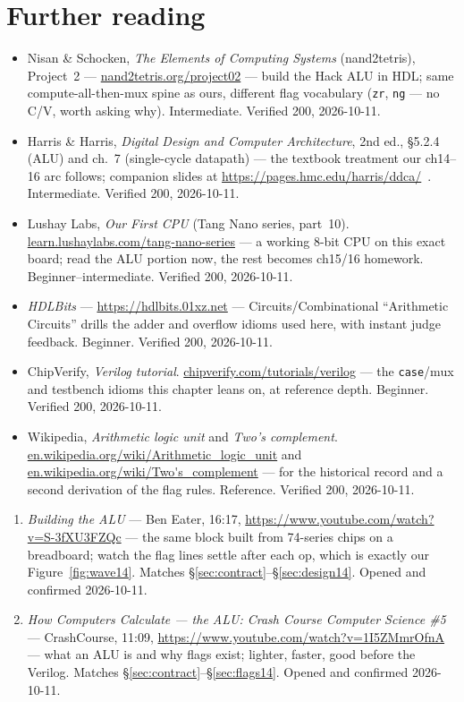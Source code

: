 \section*{Further reading}

\begin{itemize}
\item Nisan \& Schocken, \emph{The Elements of Computing Systems}
(nand2tetris), Project~2 ---\newline
\url{nand2tetris.org/project02} --- build the Hack ALU in
HDL; same compute-all-then-mux spine as ours, different flag
vocabulary (\texttt{zr}, \texttt{ng} --- no C/V, worth asking why).
Intermediate. Verified 200, 2026-10-11.
\item Harris \& Harris, \emph{Digital Design and Computer
Architecture}, 2nd ed., \S5.2.4 (ALU) and ch.~7 (single-cycle
datapath) --- the textbook treatment our ch14--16 arc follows;
companion slides at \url{https://pages.hmc.edu/harris/ddca/}~\cite{ddca}.
Intermediate. Verified 200, 2026-10-11.
\item Lushay Labs, \emph{Our First CPU} (Tang Nano series, part~10).
\url{learn.lushaylabs.com/tang-nano-series} --- a working
8-bit CPU on this exact board; read the ALU portion now, the rest
becomes ch15/16 homework. Beginner--intermediate. Verified 200,
2026-10-11.
\item \emph{HDLBits} --- \url{https://hdlbits.01xz.net} ---
Circuits/Combinational ``Arithmetic Circuits'' drills the adder and
overflow idioms used here, with instant judge feedback. Beginner.
Verified 200, 2026-10-11.
\item ChipVerify, \emph{Verilog tutorial}.\newline
\url{chipverify.com/tutorials/verilog} --- the
\texttt{case}/mux and testbench idioms this chapter leans on, at
reference depth. Beginner. Verified 200, 2026-10-11.
\item Wikipedia, \emph{Arithmetic logic unit} and \emph{Two's
complement}.
\url{en.wikipedia.org/wiki/Arithmetic_logic_unit} and
\url{en.wikipedia.org/wiki/Two's_complement} --- for the
historical record and a second derivation of the flag rules.
Reference. Verified 200, 2026-10-11.
\end{itemize}

\begin{rulebox}
\begin{enumerate}
\item \emph{Building the ALU} --- Ben Eater, 16:17,
\url{https://www.youtube.com/watch?v=S-3fXU3FZQc} --- the same block
built from 74-series chips on a breadboard; watch the flag lines
settle after each op, which is exactly our Figure~\ref{fig:wave14}.
Matches \S\ref{sec:contract}--\S\ref{sec:design14}. Opened and
confirmed 2026-10-11.
\item \emph{How Computers Calculate --- the ALU: Crash Course Computer
Science \#5} --- CrashCourse, 11:09,
\url{https://www.youtube.com/watch?v=1I5ZMmrOfnA} --- what an ALU is
and why flags exist; lighter, faster, good before the Verilog.
Matches \S\ref{sec:contract}--\S\ref{sec:flags14}. Opened and
confirmed 2026-10-11.
\end{enumerate}
\end{rulebox}

